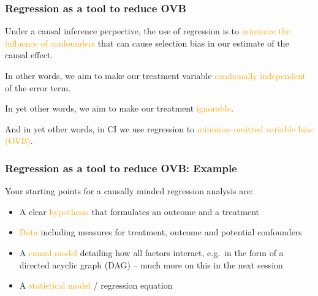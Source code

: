 \documentclass[12pt,english,dvipsnames,aspectratio=169,handout]{beamer}\usepackage[]{graphicx}\usepackage[]{xcolor}
\begin{document}
\begin{frame}
\frametitle{Regression as a tool to reduce OVB}

Under a causal inference perpective, the use of regression is to \textcolor{orange}{minimize the influence of confounders} that can cause selection bias in our estimate of the causal effect.

In other words, we aim to make our treatment variable \textcolor{orange}{condionally independent} of the error term.

In yet other words, we aim to make our treatment \textcolor{orange}{ignorable}.

And in yet other words, in CI we use regression to \textcolor{orange}{minimize omitted variable bias (OVB)}.

\end{frame}


\begin{frame}
\frametitle{Regression as a tool to reduce OVB: Example}

Your starting points for a causally minded regression analysis are: 
\begin{itemize}
  \item A clear \textcolor{orange}{hypothesis} that formulates an outcome and a treatment
  \item \textcolor{orange}{Data} including measures for treatment, outcome and potential confounders
  \item A \textcolor{orange}{causal model} detailing how all factors interact, e.g.\ in the form of a directed acyclic graph (DAG) -- much more on this in the next session
  \item A \textcolor{orange}{statistical model} / regression equation
\end{itemize}

\end{frame}
\end{document}
